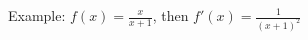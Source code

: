 \documentclass[preview]{standalone}
\begin{document}
\begin{center}
Example: $f(x) = \frac{x}{x+1}$, then $f'(x) = \frac{1}{(x+1)^2}$
\end{center}
\end{document}
